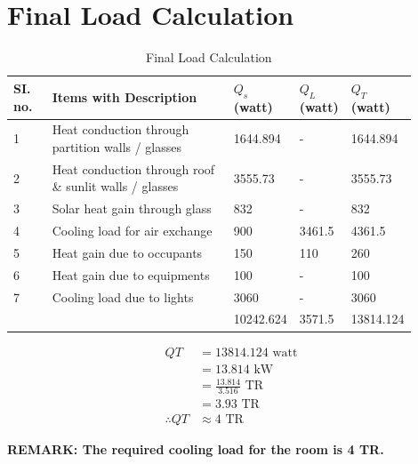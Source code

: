 \documentclass{article}
\begin{document}
    \section{Final Load Calculation}
    \begin{table}[ht]
      \centering
      \begin{adjustbox}{width=\textwidth}
      \begin{tabularx}{\linewidth}{p{0.10\linewidth} p{0.5\linewidth} p{0.10\linewidth} p{0.10\linewidth} p{0.10\linewidth}}
          \hline
          \textbf{SI. no.} & \textbf{Items with Description} & \textbf{$Q_s$ (watt)} & \textbf{$Q_L$ (watt)} & \textbf{$Q_T$ (watt)} \\
          \hline
          1 & Heat conduction through partition walls / glasses & 1644.894 & - & 1644.894 \\
          2 & Heat conduction through roof \& sunlit walls / glasses & 3555.73 & - & 3555.73 \\
          3 & Solar heat gain through glass  & 832 & - & 832 \\
          4 & Cooling load for air exchange & 900 & 3461.5 & 4361.5 \\
          5 & Heat gain due to occupants & 150 & 110 & 260 \\
          6 & Heat gain due to equipments & 100 & - & 100 \\
          7 & Cooling load due to lights & 3060 & - & 3060 \\
          \hline
          && 10242.624 & 3571.5 & 13814.124 \\
      \end{tabularx}
      \end{adjustbox}
      \caption{Final Load Calculation}
      \label{tab:Final Calculation}
      \end{table}

      \begin{align*}
        QT &= 13814.124 \text{ watt} \\
        &= 13.814 \text{ kW} \\
        &= \frac{13.814}{3.516} \text{ TR} \\
        &= 3.93 \text{ TR} \\
        \therefore QT &\approx 4 \text{ TR}
      \end{align*}

      \textbf{REMARK: The required cooling load for the room is 4 TR.}
\end{document}
